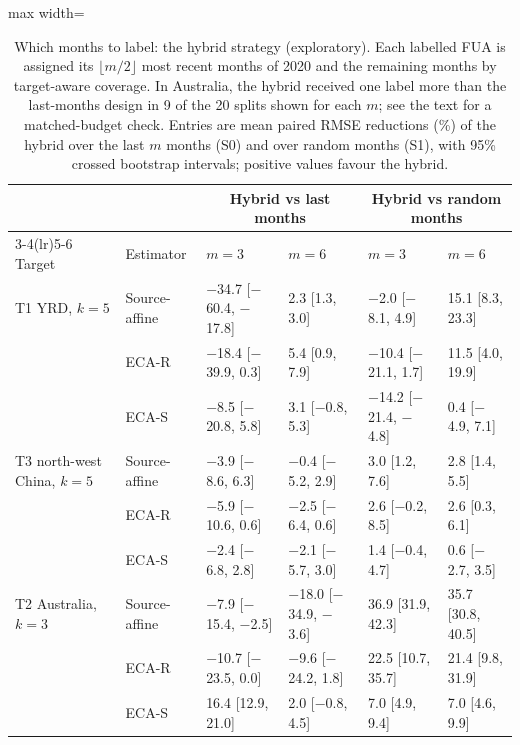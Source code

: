 \begin{table}[H]
\centering
\footnotesize
\caption{Which months to label: the hybrid strategy (exploratory). Each labelled FUA is assigned its $\lfloor m/2\rfloor$ most recent months of 2020 and the remaining months by target-aware coverage. In Australia, the hybrid received one label more than the last-months design in 9 of the 20 splits shown for each $m$; see the text for a matched-budget check. Entries are mean paired RMSE reductions (\%) of the hybrid over the last $m$ months (S0) and over random months (S1), with 95\% crossed bootstrap intervals; positive values favour the hybrid.}
\label{tab:explore-hybrid}
\setlength{\tabcolsep}{3.5pt}
\begin{adjustbox}{max width=\linewidth}
\begin{tabular}{@{}llllll@{}}
\toprule
 & & \multicolumn{2}{c}{Hybrid vs last months} & \multicolumn{2}{c}{Hybrid vs random months} \\
\cmidrule(lr){3-4}\cmidrule(lr){5-6}
Target & Estimator & $m=3$ & $m=6$ & $m=3$ & $m=6$ \\
\midrule
T1 YRD, $k=5$ & Source-affine & $-$34.7 [$-$60.4, $-$17.8] & 2.3 [1.3, 3.0] & $-$2.0 [$-$8.1, 4.9] & 15.1 [8.3, 23.3] \\
 & ECA-R & $-$18.4 [$-$39.9, 0.3] & 5.4 [0.9, 7.9] & $-$10.4 [$-$21.1, 1.7] & 11.5 [4.0, 19.9] \\
 & ECA-S & $-$8.5 [$-$20.8, 5.8] & 3.1 [$-$0.8, 5.3] & $-$14.2 [$-$21.4, $-$4.8] & 0.4 [$-$4.9, 7.1] \\
\addlinespace
T3 north-west China, $k=5$ & Source-affine & $-$3.9 [$-$8.6, 6.3] & $-$0.4 [$-$5.2, 2.9] & 3.0 [1.2, 7.6] & 2.8 [1.4, 5.5] \\
 & ECA-R & $-$5.9 [$-$10.6, 0.6] & $-$2.5 [$-$6.4, 0.6] & 2.6 [$-$0.2, 8.5] & 2.6 [0.3, 6.1] \\
 & ECA-S & $-$2.4 [$-$6.8, 2.8] & $-$2.1 [$-$5.7, 3.0] & 1.4 [$-$0.4, 4.7] & 0.6 [$-$2.7, 3.5] \\
\addlinespace
T2 Australia, $k=3$ & Source-affine & $-$7.9 [$-$15.4, $-$2.5] & $-$18.0 [$-$34.9, $-$3.6] & 36.9 [31.9, 42.3] & 35.7 [30.8, 40.5] \\
 & ECA-R & $-$10.7 [$-$23.5, 0.0] & $-$9.6 [$-$24.2, 1.8] & 22.5 [10.7, 35.7] & 21.4 [9.8, 31.9] \\
 & ECA-S & 16.4 [12.9, 21.0] & 2.0 [$-$0.8, 4.5] & 7.0 [4.9, 9.4] & 7.0 [4.6, 9.9] \\
\bottomrule
\end{tabular}
\end{adjustbox}
\end{table}
